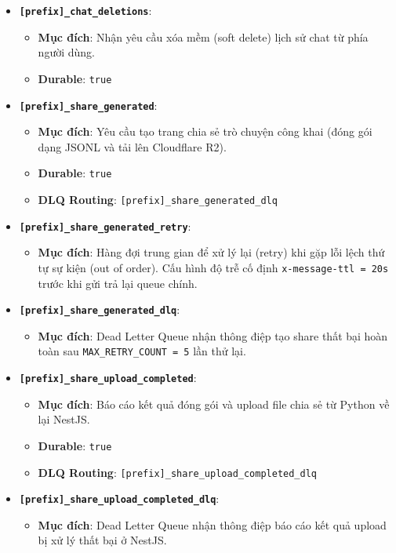 \begin{itemize}
\item \textbf{\texttt{[prefix]\_chat\_deletions}}:
\begin{itemize}
\item \textbf{Mục đích}: Nhận yêu cầu xóa mềm (soft delete) lịch sử chat từ phía người dùng.
\item \textbf{Durable}: \texttt{true}
\end{itemize}

\item \textbf{\texttt{[prefix]\_share\_generated}}:
\begin{itemize}
\item \textbf{Mục đích}: Yêu cầu tạo trang chia sẻ trò chuyện công khai (đóng gói dạng JSONL và tải lên Cloudflare R2).
\item \textbf{Durable}: \texttt{true}
\item \textbf{DLQ Routing}: \texttt{[prefix]\_share\_generated\_dlq}
\end{itemize}

\item \textbf{\texttt{[prefix]\_share\_generated\_retry}}:
\begin{itemize}
\item \textbf{Mục đích}: Hàng đợi trung gian để xử lý lại (retry) khi gặp lỗi lệch thứ tự sự kiện (out of order). Cấu hình độ trễ cố định \texttt{x-message-ttl = 20s} trước khi gửi trả lại queue chính.
\end{itemize}

\item \textbf{\texttt{[prefix]\_share\_generated\_dlq}}:
\begin{itemize}
\item \textbf{Mục đích}: Dead Letter Queue nhận thông điệp tạo share thất bại hoàn toàn sau \texttt{MAX\_RETRY\_COUNT = 5} lần thử lại.
\end{itemize}

\item \textbf{\texttt{[prefix]\_share\_upload\_completed}}:
\begin{itemize}
\item \textbf{Mục đích}: Báo cáo kết quả đóng gói và upload file chia sẻ từ Python về lại NestJS.
\item \textbf{Durable}: \texttt{true}
\item \textbf{DLQ Routing}: \texttt{[prefix]\_share\_upload\_completed\_dlq}
\end{itemize}

\item \textbf{\texttt{[prefix]\_share\_upload\_completed\_dlq}}:
\begin{itemize}
\item \textbf{Mục đích}: Dead Letter Queue nhận thông điệp báo cáo kết quả upload bị xử lý thất bại ở NestJS.
\end{itemize}


\end{itemize}
